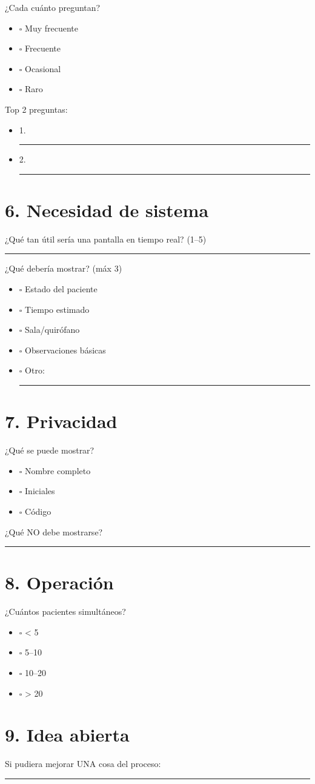 \documentclass[12pt]{article}
\begin{document}
¿Cada cuánto preguntan?
\begin{itemize}
    \item $\square$ Muy frecuente
    \item $\square$ Frecuente
    \item $\square$ Ocasional
    \item $\square$ Raro
\end{itemize}

Top 2 preguntas:
\begin{itemize}
    \item 1. \rule{10cm}{0.4pt}
    \item 2. \rule{10cm}{0.4pt}
\end{itemize}

\section*{6. Necesidad de sistema}
¿Qué tan útil sería una pantalla en tiempo real? (1–5) \\
\rule{3cm}{0.4pt}

¿Qué debería mostrar? (máx 3)
\begin{itemize}
    \item $\square$ Estado del paciente
    \item $\square$ Tiempo estimado
    \item $\square$ Sala/quirófano
    \item $\square$ Observaciones básicas
    \item $\square$ Otro: \rule{5cm}{0.4pt}
\end{itemize}

\section*{7. Privacidad}
¿Qué se puede mostrar?
\begin{itemize}
    \item $\square$ Nombre completo
    \item $\square$ Iniciales
    \item $\square$ Código
\end{itemize}

¿Qué NO debe mostrarse? \\
\rule{14cm}{0.4pt}

\section*{8. Operación}
¿Cuántos pacientes simultáneos?
\begin{itemize}
    \item $\square$ < 5
    \item $\square$ 5–10
    \item $\square$ 10–20
    \item $\square$ > 20
\end{itemize}

\section*{9. Idea abierta}
Si pudiera mejorar UNA cosa del proceso: \\
\rule{14cm}{0.4pt}
\end{document}
